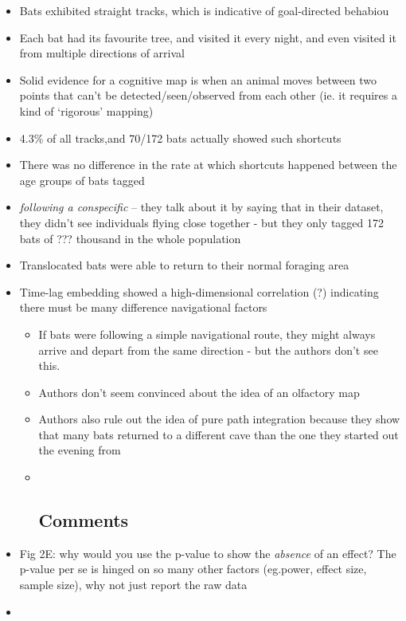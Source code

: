 \documentclass[
]{book}
\providecommand{\tightlist}{%
  \setlength{\itemsep}{0pt}\setlength{\parskip}{0pt}}
\begin{document}
\begin{itemize}
\tightlist
\item
  Bats exhibited straight tracks, which is indicative of goal-directed behabiou
\item
  Each bat had its favourite tree, and visited it every night, and even visited it from multiple directions of arrival
\item
  Solid evidence for a cognitive map is when an animal moves between two points that can't be detected/seen/observed from each other (ie. it requires a kind of `rigorous' mapping)
\item
  4.3\% of all tracks,and 70/172 bats actually showed such shortcuts
\item
  There was no difference in the rate at which shortcuts happened between the age groups of bats tagged
\item
  \emph{following a conspecific} -- they talk about it by saying that in their dataset, they didn't see individuals flying close together - but they only tagged 172 bats of ??? thousand in the whole population
\item
  Translocated bats were able to return to their normal foraging area
\item
  Time-lag embedding showed a high-dimensional correlation (?) indicating there must be many difference navigational factors

  \begin{itemize}
  \item
    If bats were following a simple navigational route, they might always arrive and depart from the same direction - but the authors don't see this.
  \item
    Authors don't seem convinced about the idea of an olfactory map
  \item
    Authors also rule out the idea of pure path integration because they show that many bats returned to a different cave than the one they started out the evening from
  \item ~
    \hypertarget{comments}{%
    \subsection{Comments}\label{comments}}
  \end{itemize}
\item
  Fig 2E: why would you use the p-value to show the \emph{absence} of an effect? The p-value per se is hinged on so many other factors (eg.power, effect size, sample size), why not just report the raw data
\item
\end{itemize}
\end{document}
